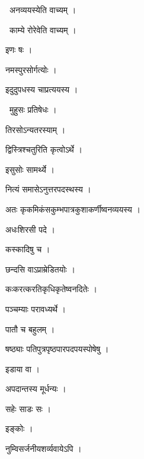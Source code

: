 \documentclass[10pt, openany, oneside]{book}
\begin{document}
\par\noindent\hspace{1.5em}{\vps वा॰}~{\qt अनव्ययस्येति वाच्यम् ।}

\par\noindent\hspace{1.5em}{\vps वा॰}~{\qt काम्ये रोरेवेति वाच्यम् ।}

\noindent इणः षः ।

\noindent नमस्पुरसोर्गत्योः ।

\noindent इदुदुपधस्य चाप्रत्ययस्य ।

\par\noindent\hspace{1.5em}{\vps वा॰}~{\qt मुहुसः प्रतिषेधः ।}

\noindent तिरसोऽन्यतरस्याम् ।

\noindent द्विस्त्रिश्चतुरिति कृत्वोऽर्थे ।

\noindent इसुसोः सामर्थ्ये ।

\noindent नित्यं समासेऽनुत्तरपदस्थस्य ।

\noindent अतः कृकमिकंसकुम्भपात्रकुशाकर्णीष्वनव्ययस्य ।

\noindent अधःशिरसी पदे ।

\noindent कस्कादिषु च ।

\noindent छन्दसि वाऽप्राम्रेडितयोः ।

\noindent कःकरत्करतिकृधिकृतेष्वनदितेः ।

\noindent पञ्चम्याः परावध्यर्थे ।

\noindent पातौ च बहुलम् ।

\noindent षष्ठ्याः पतिपुत्रपृष्ठपारपदपयस्पोषेषु ।

\noindent इडाया वा ।

\noindent अपदान्तस्य मूर्धन्यः ।

\noindent सहेः साडः सः ।

\noindent इङ्कोः ।

\noindent नुम्विसर्जनीयशर्व्यवायेऽपि ।
\end{document}
